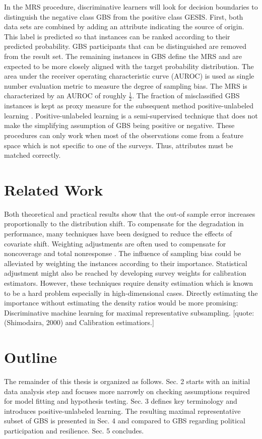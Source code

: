 In the MRS procedure, discriminative learners will look for decision boundaries to distinguish the negative class GBS from the positive class GESIS. First, both data sets are combined by adding an attribute indicating the source of origin. This label is predicted so that instances can be ranked according to their predicted probability. GBS participants that can be distinguished are removed from the result set. The remaining instances in GBS define the MRS and are expected to be more closely aligned with the target probability distribution.  The area under the receiver operating characteristic curve (AUROC) is used as single number evaluation metric to measure the degree of sampling bias. The MRS is characterized by an AUROC of roughly \(\frac{1}{2}\). The fraction of misclassified GBS instances is kept as proxy measure for the subsequent method positive-unlabeled learning \cite{denis, claesen}. Positive-unlabeled learning is a semi-supervised technique that does not make the simplifying assumption of GBS being positive or negative. These procedures can only work when most of the observations come from a feature space which is not specific to one of the surveys. Thus, attributes must be matched correctly. 

\section{Related Work}

Both theoretical and practical results show that the out-of sample error increases proportionally to the distribution shift. To compensate for the degradation in performance, many techniques have been designed to reduce the effects of covariate shift. Weighting adjustments are often used to compensate for noncoverage and total nonresponse \cite{brick}. The influence of sampling bias could be alleviated by weighting the instances according to their importance. Statistical adjustment might also be reached by developing survey weights for calibration estimators. However, these techniques require density estimation which is known to be a hard problem especially in high-dimensional cases. Directly estimating the importance without estimating the density ratios would be more promising: Discriminative machine learning for maximal representative subsampling. [quote: (Shimodaira, 2000) and Calibration estimatiors.]

\section{Outline}

The remainder of this thesis is organized as follows. Sec. 2 starts with an initial data analysis step and focuses more narrowly on checking assumptions required for model fitting and hypothesis testing. Sec. 3 defines key terminology and introduces positive-unlabeled learning. The resulting maximal representative subset of GBS is presented in Sec. 4 and compared to GBS regarding political participation and resilience. Sec. 5 concludes.
